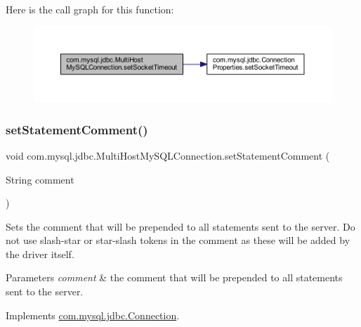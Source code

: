 Here is the call graph for this function\+:
\nopagebreak
\begin{figure}[H]
\begin{center}
\leavevmode
\includegraphics[width=350pt]{classcom_1_1mysql_1_1jdbc_1_1_multi_host_my_s_q_l_connection_ab71cfc835c4fb153654b63f887c41df0_cgraph}
\end{center}
\end{figure}
\mbox{\label{classcom_1_1mysql_1_1jdbc_1_1_multi_host_my_s_q_l_connection_ae16daacee48aa9a98fa24374bf6e7681}} 
\subsubsection{\texorpdfstring{set\+Statement\+Comment()}{setStatementComment()}}
{\footnotesize\ttfamily void com.\+mysql.\+jdbc.\+Multi\+Host\+My\+S\+Q\+L\+Connection.\+set\+Statement\+Comment (\begin{DoxyParamCaption}\item[{String}]{comment }\end{DoxyParamCaption})}

Sets the comment that will be prepended to all statements sent to the server. Do not use slash-\/star or star-\/slash tokens in the comment as these will be added by the driver itself.


\begin{DoxyParams}{Parameters}
{\em comment} & the comment that will be prepended to all statements sent to the server. \\
\hline
\end{DoxyParams}


Implements \mbox{\hyperlink{interfacecom_1_1mysql_1_1jdbc_1_1_connection_a94f38f8f7d8afd2a7bf6c87ad0d5d422}{com.\+mysql.\+jdbc.\+Connection}}.

